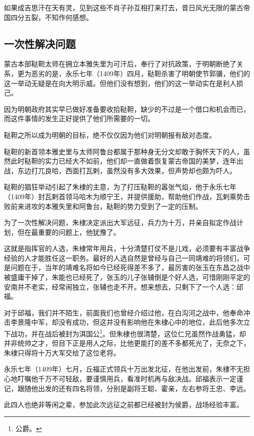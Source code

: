 \begin{multicols}{\theparacolNo}
如果成吉思汗在天有灵，见到这些不肖子孙互相打来打去，昔日风光无限的蒙古帝国四分五裂，不知作何感想。

\subsection{一次性解决问题}
蒙古本部鞑靼太师在拥立本雅失里为可汗后，奉行了对抗政策，于明朝断绝了关系，更为恶劣的是，永乐七年（1409年）四月，鞑靼杀害了明朝使节郭骥，他们的这一举动无疑是在向大明示威。但他们没有想到，他们的这一举动实在是利人损己。

因为明朝政府其实早已做好准备要收拾鞑靼，缺少的不过是一个借口和机会而已，而这件事情的发生正好提供了他们所需要的一切。

鞑靼之所以成为明朝的目标，绝不仅仅因为他们对明朝报有敌对态度。

鞑靼的新首领本雅史里与太师阿鲁台都属于那种身无分文却敢于胸怀天下的人，虽然此时鞑靼的实力已经大不如前，他们却一直做着恢复蒙古帝国的美梦，连年出战，东边打兀良哈，西面打瓦剌，虽然没有多大效果，但声势却也颇为吓人。

鞑靼的猖狂举动引起了朱棣的主意，为了打压鞑靼的嚣张气焰，他于永乐七年（1409年）封瓦剌首领马哈木为顺宁王，并提供援助，帮助他们作战，瓦剌乘势击败前来进攻的本雅失里和阿鲁台，鞑靼的势力受到了一定的压制。

为了一次性解决问题，朱棣决定派出大军远征，兵力为十万，并亲自拟定作战计划，但在最重要的问题上，他犹豫了。

这就是指挥官的人选，朱棣常年用兵，十分清楚打仗不是儿戏，必须要有丰富战争经验的人才能胜任这一职务。最好的人选自然是曾经与自己一同靖难的将领们，可是问题在于，当年的靖难名将如今已经死得差不多了，最厉害的张玉在东昌之战中被盛庸干掉了，朱能也已经死了，张玉的儿子张辅倒是个好人选，可惜刚刚平定的安南并不老实，经常闹独立，张辅也走不开。想来想去，只剩下了一个人选：邱福。

对于邱福，我们并不陌生，前面我们也曾经介绍过他，在白沟河之战中，他奉命冲击李景隆中军，却没有成功，但这并没有影响他在朱棣心中的地位，此后他多次立下战功，并在战后被封为淇国公\footnote{公爵。}。但朱棣也很清楚，这位仁兄虽然作战勇猛，却并非统帅之才，但目下正是用人之际，比他更能打的差不多都死光了，无奈之下，朱棣只得将十万大军交给了这位老将。

永乐七年（1409年）七月，丘福正式领兵十万出发北征，在他出发前，朱棣不无担心地叮嘱他千万不可轻敌，要谨慎用兵，看准时机再与敌决战。邱福表示一定谨记，跟随他出发的还有四名将领，分别是副将王聪、霍亲，左右参将王忠、李远。

此四人也绝非等闲之辈，参加此次远征之前都已经被封为侯爵，战场经验丰富。


\end{multicols}
